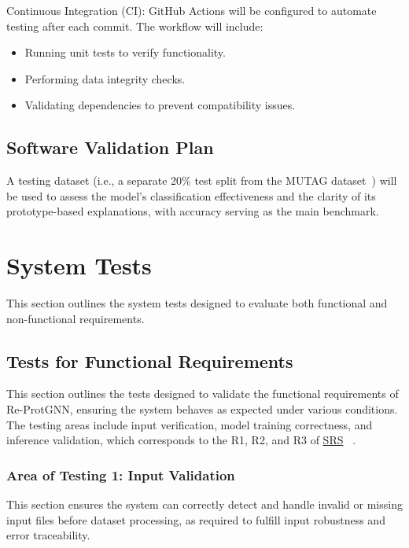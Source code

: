 \documentclass[12pt, titlepage]{article}
\begin{document}
Continuous Integration (CI):
GitHub Actions will be configured to automate testing after each commit. The workflow will include:
\begin{itemize}
    \item Running unit tests to verify functionality.
    \item Performing data integrity checks.
    \item Validating dependencies to prevent compatibility issues.
\end{itemize}



\subsection{Software Validation Plan}
\label{sec:svp}
A testing dataset (i.e., a separate 20\% test split from the MUTAG dataset~\citep{debnath1991structure}) will be used to assess the model’s classification effectiveness and the clarity of its prototype-based explanations, with accuracy serving as the main benchmark.

\section{System Tests}
\label{sec:system-tests}
This section outlines the system tests designed to evaluate both functional and non-functional requirements.

\subsection{Tests for Functional Requirements}
\label{sub:FR}
This section outlines the tests designed to validate the functional requirements of Re-ProtGNN, ensuring the system behaves as expected under various conditions. The testing areas include input verification, model training correctness, and inference validation, which corresponds to the R1, R2, and R3 of \href{https://github.com/Yuanqi-X/Re-ProtGNN/blob/main/docs/SRS/SRS.pdf}{SRS} ~\citep{Yuanqi_ReProtGNN_SRS}.


\subsubsection{Area of Testing 1: Input Validation}

This section ensures the system can correctly detect and handle invalid or missing input files before dataset processing, as required to fulfill input robustness and error traceability.
\end{document}
